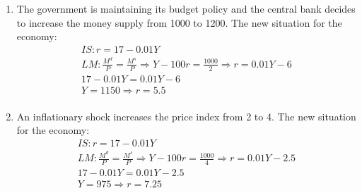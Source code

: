 \documentclass[a4paper,12pt]{article} %
\begin{document}
\begin{enumerate}
\begin{enumerate} [label=\arabic*)]
\item  The government is maintaining its budget policy and the central bank decides to increase the
money supply from 1000 to 1200. The new situation for the economy:  
\begin{gather}
IS: r = 17 - 0.01Y\\
LM: \frac{M^{d}}{P} = \frac{M^{s}}{P} \Rightarrow Y - 100r = \frac{1000}{2} \Rightarrow r =  0.01Y - 6 \\
17 - 0.01Y = 0.01Y - 6 \\
Y = 1150 \Rightarrow r = 5.5 \\
\end{gather} 
\item  An inflationary shock increases the price index from 2 to 4. The new situation for the
economy: 
\begin{gather}
IS: r = 17 - 0.01Y\\
LM: \frac{M^{d}}{P} = \frac{M^{s}}{P} \Rightarrow Y - 100r = \frac{1000}{4} \Rightarrow r =  0.01Y - 2.5 \\
17 - 0.01Y = 0.01Y - 2.5 \\
Y = 975 \Rightarrow r = 7.25 \\
\end{gather} 



\end{enumerate}


\end{enumerate}
\end{document}
